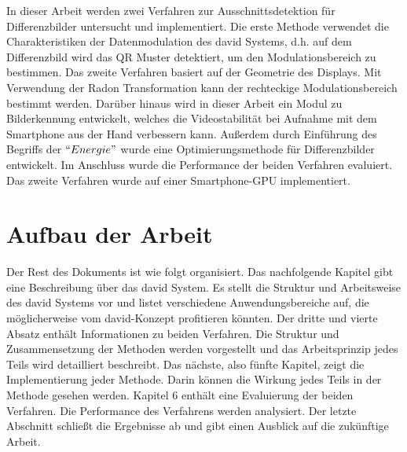 In dieser Arbeit werden zwei Verfahren zur Ausschnittsdetektion für Differenzbilder untersucht und implementiert. Die erste Methode verwendet die Charakteristiken der Datenmodulation des \gls{david} Systems, d.h. auf dem Differenzbild wird das QR Muster detektiert, um den Modulationsbereich zu bestimmen. Das zweite Verfahren basiert auf der Geometrie des Displays. Mit Verwendung der Radon Transformation kann der rechteckige Modulationsbereich bestimmt werden. Darüber hinaus wird in dieser Arbeit ein Modul zu Bilderkennung entwickelt, welches die Videostabilität bei Aufnahme mit dem Smartphone aus der Hand verbessern kann. Außerdem durch Einführung des Begriffs der $ ``Energie" $ wurde eine Optimierungsmethode für Differenzbilder entwickelt. Im Anschluss wurde die Performance der beiden Verfahren evaluiert. Das zweite Verfahren wurde auf einer Smartphone-GPU implementiert.

\section{Aufbau der Arbeit} 

Der Rest des Dokuments ist wie folgt organisiert. Das nachfolgende Kapitel gibt eine Beschreibung über das \gls{david} System. Es stellt die Struktur und Arbeitsweise des \gls{david} Systems vor und listet verschiedene Anwendungsbereiche auf, die möglicherweise vom \gls{david}-Konzept profitieren könnten. Der dritte und vierte Absatz enthält Informationen zu beiden Verfahren. Die Struktur und Zusammensetzung der Methoden werden vorgestellt und das Arbeitsprinzip jedes Teils wird detailliert beschreibt. Das nächste, also fünfte Kapitel, zeigt die Implementierung jeder Methode. Darin können die Wirkung jedes Teils in der Methode gesehen werden. %
Kapitel 6 enthält eine Evaluierung der beiden Verfahren. Die Performance des Verfahrens werden analysiert. Der letzte Abschnitt schließt die Ergebnisse ab und gibt einen Ausblick auf die zukünftige Arbeit.